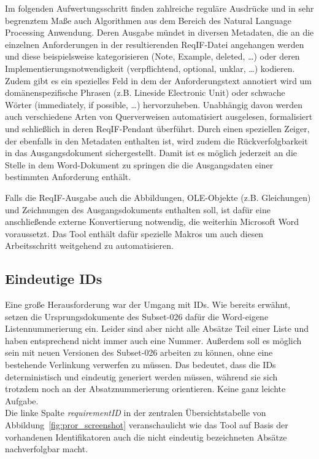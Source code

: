 \documentclass[twoside]{article}
\begin{document}
\begin{multicols}{2}
Im folgenden Aufwertungsschritt finden zahlreiche reguläre Ausdrücke und in sehr begrenztem Maße auch Algorithmen aus dem Bereich des Natural Language Processing Anwendung. Deren Ausgabe mündet in diversen Metadaten, die an die einzelnen Anforderungen in der resultierenden ReqIF-Datei angehangen werden und diese beispielsweise kategorisieren (Note, Example, deleted, \ldots ) oder deren Implementierungsnotwendigkeit (verpflichtend, optional, unklar, \ldots ) kodieren. Zudem gibt es ein spezielles Feld in dem der Anforderungstext annotiert wird um domänenspezifische Phrasen (z.B. \glqq Lineside Electronic Unit\grqq ) oder schwache Wörter (\glqq{}immediately\grqq{}, \glqq{}if possible\grqq{}, \ldots{}) hervorzuheben. Unabhängig davon werden auch verschiedene Arten von Querverweisen automatisiert ausgelesen, formalisiert und schließlich in deren ReqIF-Pendant überführt. Durch einen speziellen Zeiger, der ebenfalls in den Metadaten enthalten ist, wird zudem die Rückverfolgbarkeit in das Ausgangsdokument sichergestellt. Damit ist es möglich jederzeit an die Stelle in dem Word-Dokument zu springen die die Ausgangsdaten einer bestimmten Anforderung enthält.

Falls die ReqIF-Ausgabe auch die Abbildungen, OLE-Objekte (z.B. Gleichungen) und Zeichnungen des Ausgangsdokuments enthalten soll, ist dafür eine anschließende externe Konvertierung notwendig, die weiterhin Microsoft Word voraussetzt. Das Tool enthält dafür spezielle Makros um auch diesen Arbeitsschritt weitgehend zu automatisieren.


\subsection{Eindeutige IDs}
\label{sec:ids}

Eine große Herausforderung war der Umgang mit IDs. Wie bereits erwähnt, setzen die Ursprungsdokumente des Subset-026 dafür die Word-eigene Listennummerierung ein. Leider sind aber nicht alle Absätze Teil einer Liste und haben entsprechend nicht immer auch eine Nummer. Außerdem soll es möglich sein mit neuen Versionen des Subset-026 arbeiten zu können, ohne eine bestehende Verlinkung verwerfen zu müssen. Das bedeutet, dass die IDs deterministisch und eindeutig generiert werden müssen, während sie sich trotzdem noch an der Absatznummerierung orientieren.  Keine ganz leichte Aufgabe.\\
Die linke Spalte \emph{requirementID} in der zentralen Übersichtstabelle von Abbildung~\ref{fig:pror_screenshot} veranschaulicht wie das Tool auf Basis der vorhandenen Identifikatoren auch die nicht eindeutig bezeichneten Absätze nachverfolgbar macht.


\end{multicols}
\end{document}
